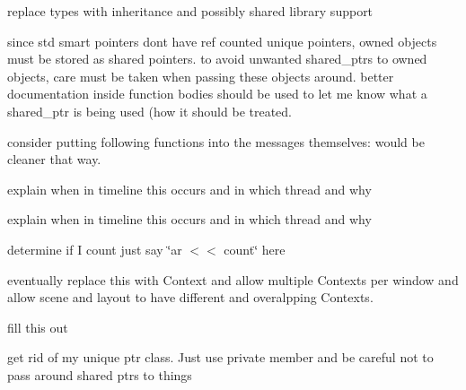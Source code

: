 \begin{DoxyRefList}
replace types with inheritance and possibly shared library support  
\item[\label{todo__todo000002}%
\hypertarget{todo__todo000002}{}%
\-Member \hyperlink{classNeb_1_1app_a729bf4c1785929d7449d614619f74191}{\-Neb\-:\-:app\-:\-:app} ()]since std smart pointers dont have ref counted unique pointers, owned objects must be stored as shared pointers. to avoid unwanted shared\-\_\-ptrs to owned objects, care must be taken when passing these objects around. better documentation inside function bodies should be used to let me know what a shared\-\_\-ptr is being used (how it should be treated.  
\item[\label{todo__todo000003}%
\hypertarget{todo__todo000003}{}%
\-Member \hyperlink{classNeb_1_1app_acefbc3bb3de71f3c8cca0afc1fada857}{\-Neb\-:\-:app\-:\-:recv\-\_\-scene\-\_\-create} (std\-::shared\-\_\-ptr$<$ gal\-::network\-::message $>$)]consider putting following functions into the messages themselves\-: would be cleaner that way.  
\item[\label{todo__todo000005}%
\hypertarget{todo__todo000005}{}%
\-Member \hyperlink{classNeb_1_1Camera_1_1Projection_1_1Base_a7a0ef0507f546a0da56bb596de53c962}{\-Neb\-:\-:\-Camera\-:\-:\-Projection\-:\-:\-Base\-:\-:step} (double)]explain when in timeline this occurs and in which thread and why  
\item[\label{todo__todo000006}%
\hypertarget{todo__todo000006}{}%
\-Member \hyperlink{classNeb_1_1Camera_1_1View_1_1Base_aa3c5978efc6cd916f0f91bb8def375c5}{\-Neb\-:\-:\-Camera\-:\-:\-View\-:\-:\-Base\-:\-:step} (double)=0]explain when in timeline this occurs and in which thread and why  
\item[\label{todo__todo000010}%
\hypertarget{todo__todo000010}{}%
\-Member \hyperlink{structNeb_1_1Message_1_1Actor_1_1OUpdate_aa972a33a8c8220e7f6194e44c019d817}{\-Neb\-:\-:\-Message\-:\-:\-Actor\-:\-:\-O\-Update\-:\-:post} ()]determine if \-I count just say \char`\"{}ar $<$$<$ count\char`\"{} here  
\item[\label{todo__todo000013}%
\hypertarget{todo__todo000013}{}%
\-Class \hyperlink{classNeb_1_1renderable}{\-Neb\-:\-:renderable} ]eventually replace this with \-Context and allow multiple \-Contexts per window and allow scene and layout to have different and overalpping \-Contexts.  
\item[\label{todo__todo000016}%
\hypertarget{todo__todo000016}{}%
\-Member \hyperlink{classNeb_1_1Shape_1_1desc_a8356295ceee1f17dd24afbdb455dd206}{\-Neb\-:\-:\-Shape\-:\-:desc\-:\-:operator$<$$<$} (\-Neb\-::\-Shape\-::shape\-\_\-w const \&)]fill this out  
\item[\label{todo__todo000007}%
\hypertarget{todo__todo000007}{}%
\-Member \hyperlink{classNeb_1_1window_1_1window_a04992828fdcd620216728e607654e26a}{\-Neb\-:\-:window\-:\-:window\-:\-:window} (\-Neb\-::window\-::desc\-\_\-s desc)]get rid of my unique ptr class. \-Just use private member and be careful not to pass around shared ptrs to things 
\end{DoxyRefList}